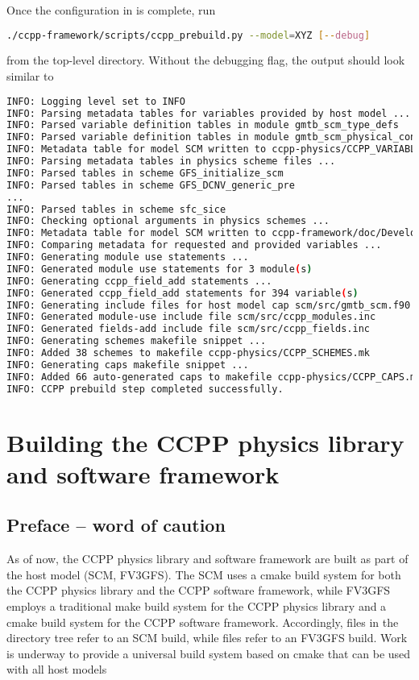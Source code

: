 Once the configuration in  is complete, run
\begin{lstlisting}[language=bash]
./ccpp-framework/scripts/ccpp_prebuild.py --model=XYZ [--debug]
\end{lstlisting}
from the top-level directory. Without the debugging flag, the output should look similar to
\begin{lstlisting}[language=bash,basicstyle=\scriptsize\ttfamily]
INFO: Logging level set to INFO
INFO: Parsing metadata tables for variables provided by host model ...
INFO: Parsed variable definition tables in module gmtb_scm_type_defs
INFO: Parsed variable definition tables in module gmtb_scm_physical_constants
INFO: Metadata table for model SCM written to ccpp-physics/CCPP_VARIABLES.html
INFO: Parsing metadata tables in physics scheme files ...
INFO: Parsed tables in scheme GFS_initialize_scm
INFO: Parsed tables in scheme GFS_DCNV_generic_pre
...
INFO: Parsed tables in scheme sfc_sice
INFO: Checking optional arguments in physics schemes ...
INFO: Metadata table for model SCM written to ccpp-framework/doc/DevelopersGuide/CCPP_VARIABLES.tex
INFO: Comparing metadata for requested and provided variables ...
INFO: Generating module use statements ...
INFO: Generated module use statements for 3 module(s)
INFO: Generating ccpp_field_add statements ...
INFO: Generated ccpp_field_add statements for 394 variable(s)
INFO: Generating include files for host model cap scm/src/gmtb_scm.f90 ...
INFO: Generated module-use include file scm/src/ccpp_modules.inc
INFO: Generated fields-add include file scm/src/ccpp_fields.inc
INFO: Generating schemes makefile snippet ...
INFO: Added 38 schemes to makefile ccpp-physics/CCPP_SCHEMES.mk
INFO: Generating caps makefile snippet ...
INFO: Added 66 auto-generated caps to makefile ccpp-physics/CCPP_CAPS.mk
INFO: CCPP prebuild step completed successfully.
\end{lstlisting}

\section{Building the CCPP physics library and software framework}
\label{sec_ccpp_build}
\subsection{Preface -- word of caution}
As of now, the CCPP physics library and software framework are built as part of the host model (SCM, FV3GFS). The SCM uses a cmake build system for both the CCPP physics library and the CCPP software framework, while FV3GFS employs a traditional make build system for the CCPP physics library and a cmake build system for the CCPP software framework. Accordingly,  files in the  directory tree refer to an SCM build, while  files refer to an FV3GFS build. Work is underway to provide a universal build system based on cmake that can be used with all host models

